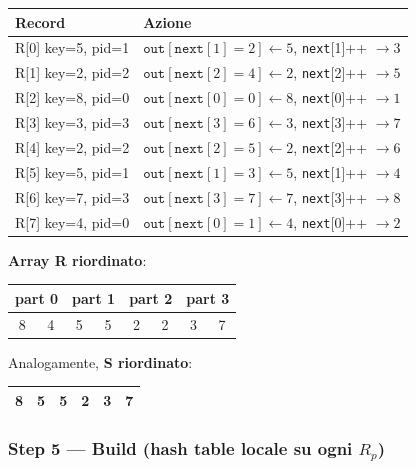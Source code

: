 \documentclass[11pt,a4paper]{article}
\begin{document}
\begin{center}\small
\begin{tabular}{ll}
\toprule
\textbf{Record} & \textbf{Azione}\\\midrule
R[0] key=5, pid=1 & $\texttt{out}[\texttt{next}[1]{=}2] \leftarrow 5$, \;\texttt{next}[1]++ $\to 3$\\
R[1] key=2, pid=2 & $\texttt{out}[\texttt{next}[2]{=}4] \leftarrow 2$, \;\texttt{next}[2]++ $\to 5$\\
R[2] key=8, pid=0 & $\texttt{out}[\texttt{next}[0]{=}0] \leftarrow 8$, \;\texttt{next}[0]++ $\to 1$\\
R[3] key=3, pid=3 & $\texttt{out}[\texttt{next}[3]{=}6] \leftarrow 3$, \;\texttt{next}[3]++ $\to 7$\\
R[4] key=2, pid=2 & $\texttt{out}[\texttt{next}[2]{=}5] \leftarrow 2$, \;\texttt{next}[2]++ $\to 6$\\
R[5] key=5, pid=1 & $\texttt{out}[\texttt{next}[1]{=}3] \leftarrow 5$, \;\texttt{next}[1]++ $\to 4$\\
R[6] key=7, pid=3 & $\texttt{out}[\texttt{next}[3]{=}7] \leftarrow 7$, \;\texttt{next}[3]++ $\to 8$\\
R[7] key=4, pid=0 & $\texttt{out}[\texttt{next}[0]{=}1] \leftarrow 4$, \;\texttt{next}[0]++ $\to 2$\\
\bottomrule
\end{tabular}
\end{center}

\medskip
\textbf{Array R riordinato}:
\begin{center}\small
\begin{tabular}{|c|c||c|c||c|c||c|c|}
\hline
\multicolumn{2}{|c||}{\cellcolor{blue!10}part 0} &
\multicolumn{2}{c||}{\cellcolor{green!10}part 1} &
\multicolumn{2}{c||}{\cellcolor{orange!10}part 2} &
\multicolumn{2}{c|}{\cellcolor{red!10}part 3} \\\hline
8 & 4 & 5 & 5 & 2 & 2 & 3 & 7\\\hline
\end{tabular}
\end{center}

Analogamente, \textbf{S riordinato}: \;
\begin{tabular}{|c||c|c||c||c|c|}
\hline
\cellcolor{blue!10}8 & \cellcolor{green!10}5 & \cellcolor{green!10}5 & \cellcolor{orange!10}2 & \cellcolor{red!10}3 & \cellcolor{red!10}7\\\hline
\end{tabular}

\subsubsection{Step 5 --- Build (hash table locale su ogni $R_p$)}
\end{document}
